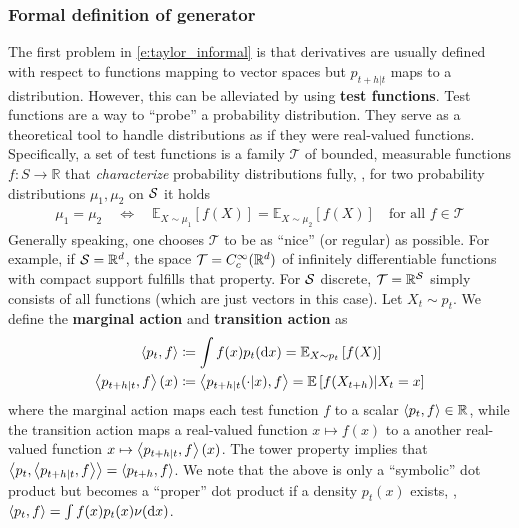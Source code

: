 \documentclass{fairmeta}
\newcommand{\highlight}[1]{{\color{metablue} \textbf{#1}}}
\numberwithin{equation}{section}
\begin{document}
\subsubsection{Formal definition of generator}
\label{subsec:formal_definition_generator}
The first problem in \cref{e:taylor_informal} is that derivatives are usually defined with respect to functions mapping to vector spaces but $p_{t+h|t}$ maps to a distribution. However, this can be alleviated by using \highlight{test functions}.  Test functions are a way to ``probe'' a probability distribution. They serve as a theoretical tool to handle distributions as if they were real-valued functions.  Specifically, a set of test functions is a family $\mathcal{T}$ of bounded, measurable functions $f:S\to\mathbb{R}$ that \emph{characterize} probability distributions fully, \ie, for two probability distributions $\mu_1,\mu_2$ on ${\mathcal{S}}$ it holds 
\begin{align}
\label{eq:test_function_requirement}
\mu_1=\mu_2\quad \Leftrightarrow \quad \mathbb{E}_{X\sim \mu_1}[f(X)]=\mathbb{E}_{X\sim \mu_2}[f(X)]\quad\text{for all }f\in\mathcal{T}
\end{align}
Generally speaking, one chooses $\mathcal{T}$ to be as ``nice'' (or regular) as possible. For example, if ${\mathcal{S}}=\mathbb{R}^d$, the space $\mathcal{T}=C_c^{\infty}(\mathbb R^d)$ of infinitely differentiable functions with compact support fulfills that property. For ${\mathcal{S}}$ discrete, $\mathcal{T}=\mathbb{R}^{{\mathcal{S}}}$ simply consists of all functions (which are just vectors in this case). Let $X_t\sim p_t$. We define the \highlight{marginal action} and \highlight{transition action} as
\begin{align}
\label{eq:marginal_action}
    \action{p_t}{f} &\defe \int f(x)p_t(\dd x) = \E_{X\sim p_t}\brac{f(X)}\\ %
    \action{\tkernel_{t+h|t}}{f}(x) &\defe\ip{\tkernel_{t+h|t}(\cdot|x),f}= \E\brac{f(X_{t+h})|X_t=x} %
\end{align}
where the marginal action maps each test function $f$ to a scalar $\left \langle p_t,f \right \rangle\in\mathbb{R}$, while the transition action maps a real-valued function $x\mapsto f(x)$ to a another real-valued function $x\mapsto \left \langle p_{t+h|t},f \right \rangle(x)$. The tower property implies that $\left \langle p_t,\left \langle p_{t+h|t},f \right \rangle \right \rangle=\left \langle p_{t+h},f \right \rangle$. We note that the above is only a ``symbolic'' dot product but becomes a ``proper'' dot product if a density $p_t(x)$ exists, \ie, $\left \langle p_t,f \right \rangle=\int f(x)p_t(x)\nu(\mathrm{d} x)$.
\end{document}
